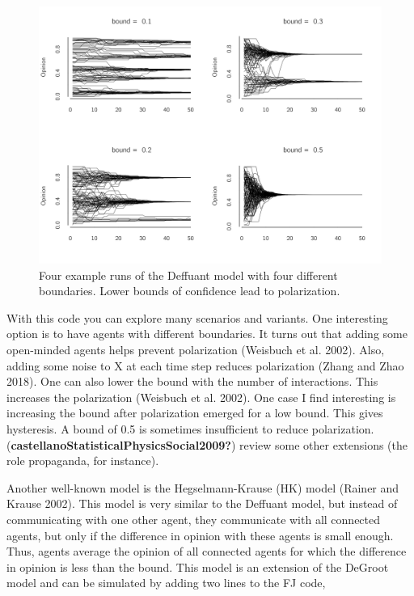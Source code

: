 \documentclass[
  a4paper,
  DIV=11,
  numbers=noendperiod]{scrreprt}
\begin{document}
\begin{figure}

{\centering \includegraphics{media/ch7/fig-ch7-img8-old-96.png}

}

\caption{\label{fig-ch7-img8-old-96}Four example runs of the Deffuant
model with four different boundaries. Lower bounds of confidence lead to
polarization.}

\end{figure}

With this code you can explore many scenarios and variants. One
interesting option is to have agents with different boundaries. It turns
out that adding some open-minded agents helps prevent polarization
(Weisbuch et al. 2002). Also, adding some noise to X at each time step
reduces polarization (Zhang and Zhao 2018). One can also lower the bound
with the number of interactions. This increases the polarization
(Weisbuch et al. 2002). One case I find interesting is increasing the
bound after polarization emerged for a low bound. This gives hysteresis.
A bound of 0.5 is sometimes insufficient to reduce polarization.
(\textbf{castellanoStatisticalPhysicsSocial2009?}) review some other
extensions (the role propaganda, for instance).

Another well-known model is the Hegselmann-Krause (HK) model (Rainer and
Krause 2002). This model is very similar to the Deffuant model, but
instead of communicating with one other agent, they communicate with all
connected agents, but only if the difference in opinion with these
agents is small enough. Thus, agents average the opinion of all
connected agents for which the difference in opinion is less than the
bound. This model is an extension of the DeGroot model and can be
simulated by adding two lines to the FJ code,
\end{document}
